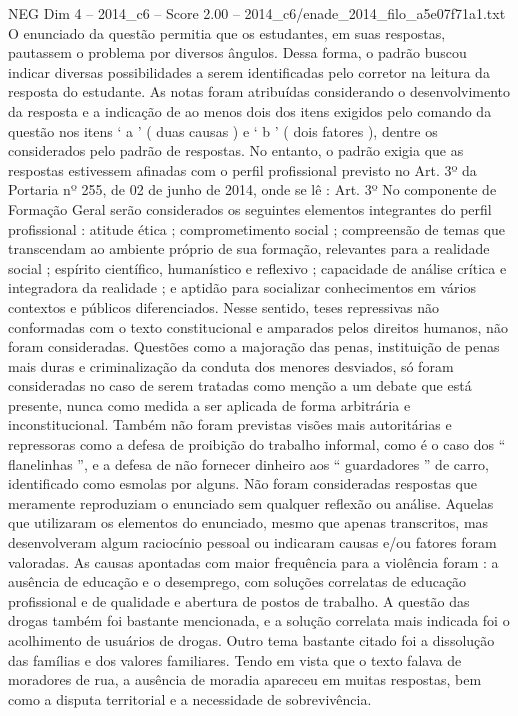 \begin{textsample}{NEG Dim 4 – 2014\_c6 – Score 2.00 – 2014\_c6/enade\_2014\_filo\_a5e07f71a1.txt}
O enunciado da questão permitia que os estudantes, em suas respostas, pautassem o problema por diversos ângulos.
Dessa forma, o padrão buscou indicar diversas possibilidades a serem identificadas pelo corretor na leitura da resposta do estudante.
As notas foram atribuídas considerando o desenvolvimento da resposta e a indicação de ao menos dois dos itens exigidos pelo comando da questão nos itens ‘ a ’ ( duas causas ) e ‘ b ’ ( dois fatores ), dentre os considerados pelo padrão de respostas.
No entanto, o padrão exigia que as respostas estivessem afinadas com o perfil profissional previsto no Art. 3º da Portaria nº 255, de 02 de junho de 2014, onde se lê : Art. 3º No componente de Formação Geral serão considerados os seguintes elementos integrantes do perfil profissional : atitude ética ; comprometimento social ; compreensão de temas que transcendam ao ambiente próprio de sua formação, relevantes para a realidade social ; espírito científico, humanístico e reflexivo ; capacidade de análise crítica e integradora da realidade ; e aptidão para socializar conhecimentos em vários contextos e públicos diferenciados.
Nesse sentido, teses repressivas não conformadas com o texto constitucional e amparados pelos direitos humanos, não foram consideradas.
Questões como a majoração das penas, instituição de penas mais duras e criminalização da conduta dos menores desviados, só foram consideradas no caso de serem tratadas como menção a um debate que está presente, nunca como medida a ser aplicada de forma arbitrária e inconstitucional.
Também não foram previstas visões mais autoritárias e repressoras como a defesa de proibição do trabalho informal, como é o caso dos “ flanelinhas ”, e a defesa de não fornecer dinheiro aos “ guardadores ” de carro, identificado como esmolas por alguns.
Não foram consideradas respostas que meramente reproduziam o enunciado sem qualquer reflexão ou análise.
Aquelas que utilizaram os elementos do enunciado, mesmo que apenas transcritos, mas desenvolveram algum raciocínio pessoal ou indicaram causas e/ou fatores foram valoradas.
As causas apontadas com maior frequência para a violência foram : a ausência de educação e o desemprego, com soluções correlatas de educação profissional e de qualidade e abertura de postos de trabalho.
A questão das drogas também foi bastante mencionada, e a solução correlata mais indicada foi o acolhimento de usuários de drogas.
Outro tema bastante citado foi a dissolução das famílias e dos valores familiares.
Tendo em vista que o texto falava de moradores de rua, a ausência de moradia apareceu em muitas respostas, bem como a disputa territorial e a necessidade de sobrevivência.

\end{textsample}

